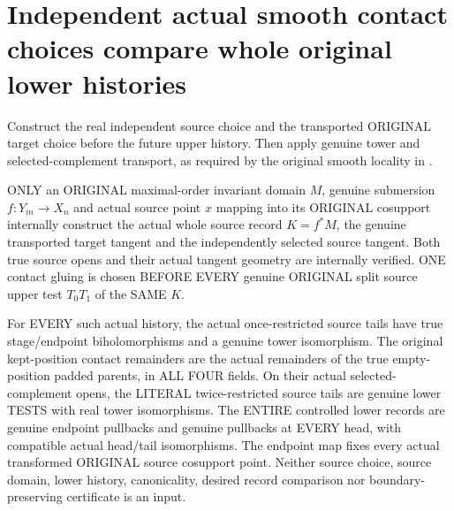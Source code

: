 \section{Independent actual smooth contact choices compare whole original lower histories}

Construct the real independent source choice and the transported ORIGINAL
target choice before the future upper history. Then apply genuine tower and
selected-complement transport, as required by the original smooth locality
in \cite[Sections~5 and~7]{bierstone-milman08-functoriality}.

\begin{theorem}
\label{hir:original-smooth-independent-source-entire-lower-histories}
\leanok
ONLY an ORIGINAL maximal-order invariant domain $M$, genuine submersion
$f:Y_m\to X_n$ and actual source point $x$ mapping into its ORIGINAL
cosupport internally construct the actual whole source record $K=f^*M$,
the genuine transported target tangent and the independently selected
source tangent. Both true source opens and their actual tangent geometry
are internally verified. ONE contact gluing is chosen BEFORE EVERY
genuine ORIGINAL split source upper test $T_0T_1$ of the SAME $K$.

For EVERY such actual history, the actual once-restricted source tails
have true stage/endpoint biholomorphisms and a genuine tower isomorphism.
The original kept-position contact remainders are the actual remainders
of the true empty-position padded parents, in ALL FOUR fields. On their
actual selected-complement opens, the LITERAL twice-restricted source
tails are genuine lower TESTS with real tower isomorphisms. The ENTIRE
controlled lower records are genuine endpoint pullbacks and genuine
pullbacks at EVERY head, with compatible actual head/tail isomorphisms.
The endpoint map fixes every actual transformed ORIGINAL source cosupport
point. Neither source choice, source domain, lower history, canonicality,
desired record comparison nor boundary-preserving certificate is an input.
\end{theorem}
